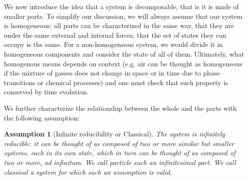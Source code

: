 \documentclass[aps,pra,10pt,twocolumn,floatfix,nofootinbib]{revtex4-1}
\newtheorem{assump}{Assumption}
\theoremstyle{definition}
\begin{document}



We now introduce the idea that a system is decomposable, that is it is made of smaller parts. To simplify our discussion, we will always assume that our system is homogeneous: all parts can be characterized in the same way, that they are under the same external and internal forces, that the set of states they can occupy is the same. For a non-homogeneous system, we would divide it in homogeneous components and consider the state of all of them. Ultimately, what homogenous means depends on context (e.g. air can be thought as homogeneous if the mixture of gasses does not change in space or in time due to phase transitions or chemical processes) and one must check that such property is conserved by time evolution.

We further characterize the relationship between the whole and the parts with the following assumption:

\begin{assump}[Infinite reducibility or Classical]\label{classical}
The system is infinitely reducible: it can be thought of as composed of two or more similar but smaller systems, each in its own state, which in turn can be thought of as composed of two or more, ad infinitum. We call \emph{particle} such an infinitesimal part. We call \emph{classical} a system for which such an assumption is valid.
\end{assump}
\end{document}
